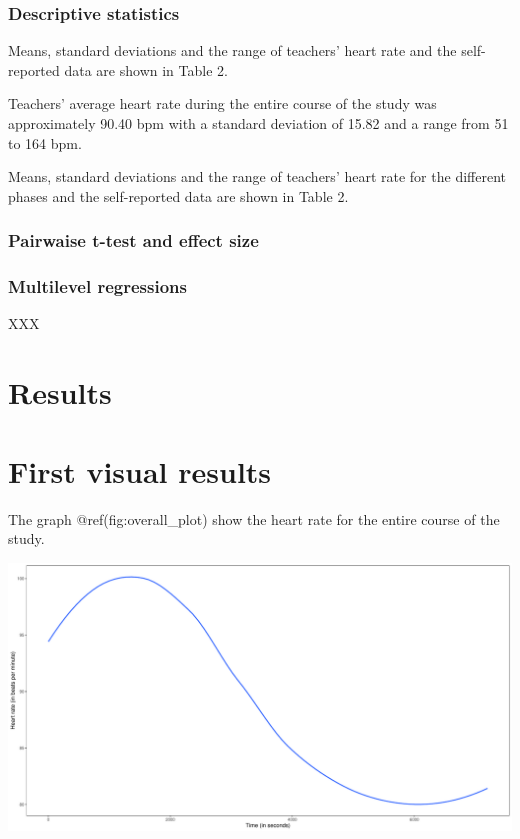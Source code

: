 \documentclass[
  man,floatsintext]{apa6}
\begin{document}
\hypertarget{descriptive-statistics}{%
\subsubsection{Descriptive statistics}\label{descriptive-statistics}}

Means, standard deviations and the range of teachers' heart rate and the self-reported data are shown in Table 2.

Teachers' average heart rate during the entire course of the study was approximately 90.40 bpm with a standard deviation of 15.82 and a range from 51 to 164 bpm.

Means, standard deviations and the range of teachers' heart rate for the different phases and the self-reported data are shown in Table 2.

\hypertarget{pairwaise-t-test-and-effect-size}{%
\subsubsection{Pairwaise t-test and effect size}\label{pairwaise-t-test-and-effect-size}}

\hypertarget{multilevel-regressions}{%
\subsubsection{Multilevel regressions}\label{multilevel-regressions}}

XXX

\hypertarget{results}{%
\section{Results}\label{results}}

\hypertarget{first-visual-results}{%
\section{First visual results}\label{first-visual-results}}

The graph @ref(fig:overall\_plot) show the heart rate for the entire course of the study.

\includegraphics{fitbit_paper_files/figure-latex/overall_plot-1.pdf}
\end{document}
